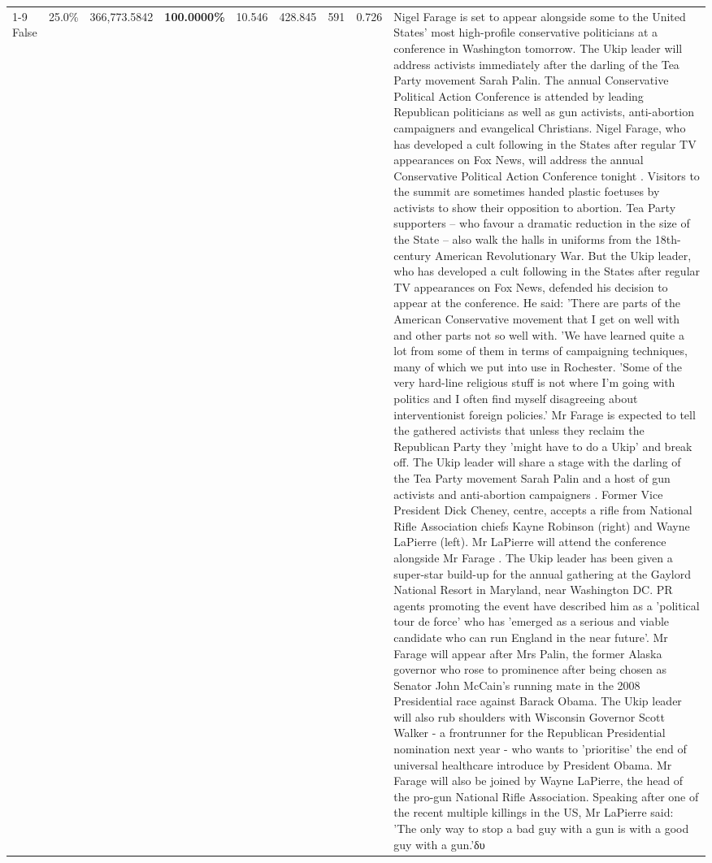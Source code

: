 \begin{table}[H]
\begin{tabular}{lllrlllll}
\cline{1-9}
False & 25.0\% & 366,773.5842 & \bfseries \color{red} 100.0000\% & 10.546 & 428.845 & 591 & 0.726 & Nigel Farage is set to appear alongside some to the United States' most high-profile conservative politicians at a conference in Washington tomorrow. The Ukip leader will address activists immediately after the darling of the Tea Party movement Sarah Palin. The annual Conservative Political Action Conference is attended by leading Republican politicians as well as gun activists, anti-abortion campaigners and evangelical Christians. Nigel Farage, who has developed a cult following in the States after regular TV appearances on Fox News, will address the annual Conservative Political Action Conference tonight . Visitors to the summit are sometimes handed plastic foetuses by activists to show their opposition to abortion. Tea Party supporters – who favour a dramatic reduction in the size of the State – also walk the halls in uniforms from the 18th-century American Revolutionary War. But the Ukip leader, who has developed a cult following in the States after regular TV appearances on Fox News, defended his decision to appear at the conference. He said: 'There are parts of the American Conservative movement that I get on well with and other parts not so well with. 'We have learned quite a lot from some of them in terms of campaigning techniques, many of which we put into use in Rochester. 'Some of the very hard-line religious stuff is not where I'm going with politics and I often find myself disagreeing about interventionist foreign policies.' Mr Farage is expected to tell the gathered activists that unless they reclaim the Republican Party they 'might have to do a Ukip' and break off. The Ukip leader will share a stage with the darling of the Tea Party movement Sarah Palin and a host of gun activists and anti-abortion campaigners . Former Vice President Dick Cheney, centre, accepts a rifle from National Rifle Association chiefs Kayne Robinson (right) and Wayne LaPierre (left). Mr LaPierre will attend the conference alongside Mr Farage . The Ukip leader has been given a super-star build-up for the annual gathering at the Gaylord National Resort in Maryland, near Washington DC. PR agents promoting the event have described him as a 'political tour de force' who has 'emerged as a serious and viable candidate who can run England in the near future'. Mr Farage will appear after Mrs Palin, the former Alaska governor who rose to prominence after being chosen as Senator John McCain's running mate in the 2008 Presidential race against Barack Obama. The Ukip leader will also rub shoulders with Wisconsin Governor Scott Walker - a frontrunner for the Republican Presidential nomination next year - who wants to 'prioritise' the end of universal healthcare introduce by President Obama. Mr Farage will also be joined by Wayne LaPierre, the head of the pro-gun National Rifle Association. Speaking after one of the recent multiple killings in the US, Mr LaPierre said: 'The only way to stop a bad guy with a gun is with a good guy with a gun.'δυ \\

\end{tabular}
\end{table}
